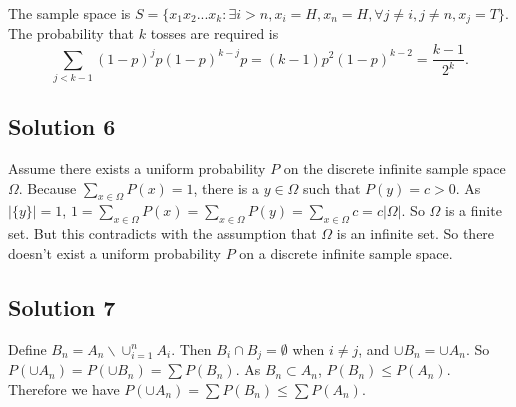 The sample space is $S = \{ x_1 x_2 ... x_k : \exists i > n, x_i = H, x_n = H, \forall j \neq i, j \neq n, x_j = T\}$.
The probability that $k$ tosses are required is
\begin{equation*}
    \sum_{j < k - 1} (1 - p)^j p (1 - p)^{k - j} p
        = (k - 1) p^2 (1 - p)^{k - 2}
        = \frac{k - 1}{2^k}.
\end{equation*}


\subsection*{Solution 6}

Assume there exists a uniform probability $P$ on the discrete infinite sample space $\Omega$.
Because $\sum_{x \in \Omega} P(x) = 1$, there is a $y \in \Omega$ such that $P(y) = c > 0$.
As $|\{y\}| = 1$, $1 = \sum_{x \in \Omega} P(x) = \sum_{x \in \Omega} P(y) = \sum_{x \in \Omega} c = c |\Omega|$.
So $\Omega$ is a finite set.
But this contradicts with the assumption that $\Omega$ is an infinite set.
So there doesn't exist a uniform probability $P$ on a discrete infinite sample space.


\subsection*{Solution 7}

Define $B_n = A_n \backslash \cup_{i = 1}^n A_i$.
Then $B_i \cap B_j = \emptyset$ when $i \neq j$, and $\cup B_n = \cup A_n$.
So $P(\cup A_n) = P(\cup B_n) = \sum P(B_n)$.
As $B_n \subset A_n$, $P(B_n) \leq P(A_n)$.
Therefore we have $P(\cup A_n) = \sum P(B_n) \leq \sum P(A_n)$.
